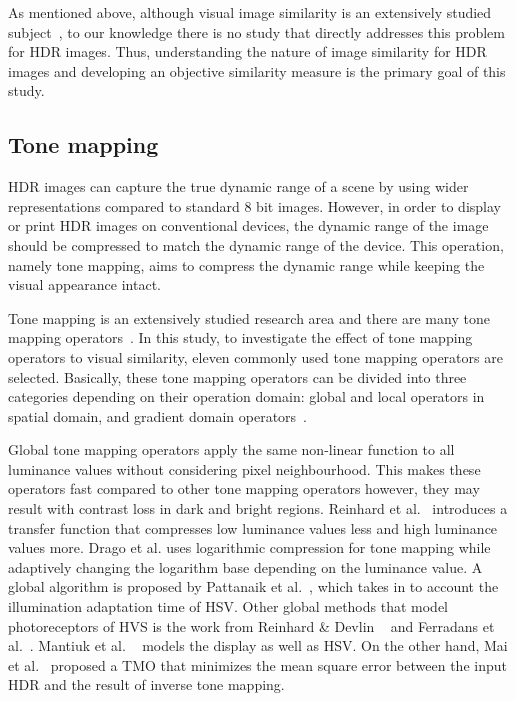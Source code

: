 As mentioned above, although visual image similarity is an extensively studied subject~\cite{liu2007survey}, to our knowledge there is no study that directly addresses this problem for HDR images. Thus, understanding the nature of image similarity for HDR images and developing an objective similarity measure is the primary goal of this study. 

\subsection{Tone mapping}
HDR images can capture the true dynamic range of a scene by using wider representations compared to standard 8 bit images. However, in order to display or print HDR images on conventional devices, the dynamic range of the image should be compressed to match the dynamic range of the device. This operation, namely tone mapping, aims to compress the dynamic range while keeping the visual appearance intact. 

Tone mapping is an extensively studied research area and there are many tone mapping operators~\cite{Rein2010}. In this study, to investigate the effect of tone mapping operators to visual similarity, eleven commonly used tone mapping operators are selected. Basically, these tone mapping operators can be divided into three categories depending on their operation domain: global and local operators in spatial domain, and gradient domain operators~\cite{Rein2010}. 

Global tone mapping operators apply the same non-linear function to all luminance values without considering pixel neighbourhood. This makes these operators fast compared to other tone mapping operators however, they may result with contrast loss in dark and bright regions. Reinhard et al.~\cite{reinhard2002photographic} introduces a transfer function that compresses low luminance values less and high luminance values more. Drago et al. \cite{drago2003adaptive} uses logarithmic compression for tone mapping while adaptively changing the logarithm base depending on the luminance value. A global algorithm is proposed by Pattanaik et al.~\cite{pattanaik2000time}, which takes in to account the illumination adaptation time of HSV. Other global methods that model photoreceptors of HVS is the work from Reinhard \& Devlin ~\cite{reinhard2005dynamic} and Ferradans et al.~\cite{ferradans2011analysis}. Mantiuk et al. ~\cite{mantiuk2008display} models the display as well as HSV. On the other hand, Mai et al.~\cite{mai2010optimizing} proposed a TMO that minimizes the mean square error between the input HDR and the result of inverse tone mapping.

